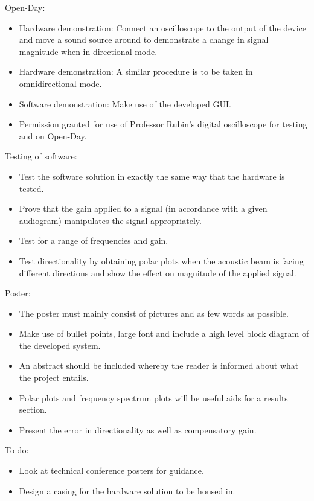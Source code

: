 \documentclass[10pt,onecolumn]{witseiepaper}
\begin{document}
Open-Day:
\begin{itemize}
	\item Hardware demonstration: Connect an oscilloscope to the output of the device and move a sound source around to demonstrate a change in signal magnitude when in directional mode.
	\item Hardware demonstration: A similar procedure is to be taken in omnidirectional mode.
	\item Software demonstration: Make use of the developed GUI.
	\item Permission granted for use of Professor Rubin's digital oscilloscope for testing and on Open-Day.
\end{itemize}

Testing of software:
\begin{itemize}
	\item Test the software solution in exactly the same way that the hardware is tested.
	\item Prove that the gain applied to a signal (in accordance with a given audiogram) manipulates the signal appropriately.
	\item Test for a range of frequencies and gain.
	\item Test directionality by obtaining polar plots when the acoustic beam is facing different directions and show the effect on magnitude of the applied signal.
\end{itemize}

Poster:
\begin{itemize}
	\item The poster must mainly consist of pictures and as few words as possible.
	\item Make use of bullet points, large font and include a high level block diagram of the developed system.
	\item An abstract should be included whereby the reader is informed about what the project entails.
	\item Polar plots and frequency spectrum plots will be useful aids for a results section.
	\item Present the error in directionality as well as compensatory gain.
\end{itemize}

To do:
\begin{itemize}
	\item Look at technical conference posters for guidance.
	\item Design a casing for the hardware solution to be housed in.
\end{itemize}
\end{document}
